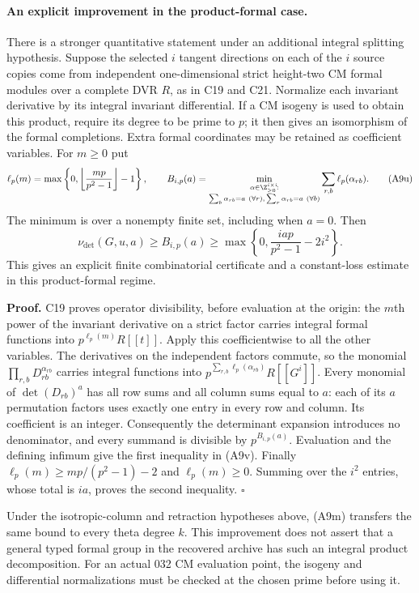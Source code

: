 \documentclass[11pt]{article}
\theoremstyle{definition}\newtheorem{definition}[theorem]{Definition}\newtheorem{remark}[theorem]{Remark}
\begin{document}
\paragraph{An explicit improvement in the product-formal case.}
There is a stronger quantitative statement under an additional
integral splitting hypothesis.  Suppose the selected $i$ tangent
directions on each of the $i$ source copies come from independent
one-dimensional strict height-two CM formal modules over a complete
DVR $R$, as in C19 and C21.  Normalize each invariant derivative
by its integral invariant differential.  If a CM isogeny is used
to obtain this product, require its degree to be prime to $p$;
it then gives an isomorphism of the formal completions.  Extra
formal coordinates may be retained as coefficient variables.
For $m\geq0$ put
\[
 \ell_p(m)=\max\left\{0,
          \left\lfloor\frac{mp}{p^2-1}\right\rfloor-1\right\},
 \qquad
 B_{i,p}(a)=
 \min_{\substack{\alpha\in\Z_{\geq0}^{i\times i}\!:\\
               \sum_b\alpha_{rb}=a\ (\forall r),\,
               \sum_r\alpha_{rb}=a\ (\forall b)}}
                   \sum_{r,b}\ell_p(\alpha_{rb}).
 \tag{A9u}
\]
The minimum is over a nonempty finite set, including when
$a=0$.  Then
\[
 \nu_{\det}(G,u,a)\geq B_{i,p}(a)
       \geq\max\left\{0,
                  \frac{iap}{p^2-1}-2i^2\right\}.
 \tag{A9v}
\]
This gives an explicit finite combinatorial certificate and a
constant-loss estimate in this product-formal regime.

\textbf{Proof.}
C19 proves operator divisibility, before evaluation at the
origin: the $m$th power of the invariant derivative on a strict
factor carries integral formal functions into
$p^{\ell_p(m)}R[[t]]$.  Apply this coefficientwise to all the
other variables.  The derivatives on the independent factors
commute, so the monomial $\prod_{r,b}D_{rb}^{\alpha_{rb}}$
carries integral functions into
$p^{\sum_{r,b}\ell_p(\alpha_{rb})}R[[G^i]]$.
Every monomial of $\det(D_{rb})^a$ has all row sums and all
column sums equal to $a$: each of its $a$ permutation factors
uses exactly one entry in every row and column.  Its coefficient
is an integer.  Consequently the determinant expansion introduces
no denominator, and every summand is divisible by
$p^{B_{i,p}(a)}$.  Evaluation and the defining infimum give
the first inequality in (A9v).  Finally
$\ell_p(m)\geq mp/(p^2-1)-2$ and $\ell_p(m)\geq0$.
Summing over the $i^2$ entries, whose total is $ia$, proves
the second inequality. \hfill$\square$

Under the isotropic-column and retraction hypotheses above,
(A9m) transfers the same bound to every theta degree $k$.
This improvement does not assert that a general typed formal
group in the recovered archive has such an integral product
decomposition.  For an actual 032 CM evaluation point, the
isogeny and differential normalizations must be checked at the
chosen prime before using it.
\end{document}
